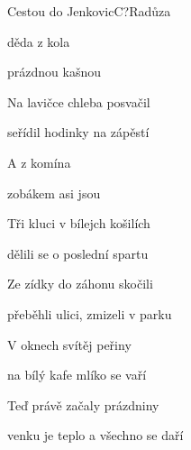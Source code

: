 \begin{song}{Cestou do Jenkovic}{C?}{Radůza}

\begin{SBVerse}

 děda z kola 

 prázdnou kašnou 

Na lavičce chleba posvačil

seřídil hodinky na zápěstí

\end{SBVerse}

\begin{SBChorus}

A  z komína 

zobákem  asi jsou 

\end{SBChorus}

\begin{SBVerse}

Tři kluci v bílejch košilích

dělili se o poslední spartu

Ze zídky do záhonu skočili

přeběhli ulici, zmizeli v parku

\end{SBVerse}

\begin{SBChorus}

\end{SBChorus}

\begin{SBVerse}

V oknech svítěj peřiny

na bílý kafe mlíko se vaří

Teď právě začaly prázdniny

venku je teplo a všechno se daří

\end{SBVerse}

\begin{SBChorus}

\end{SBChorus}

\end{song}

\clearpage